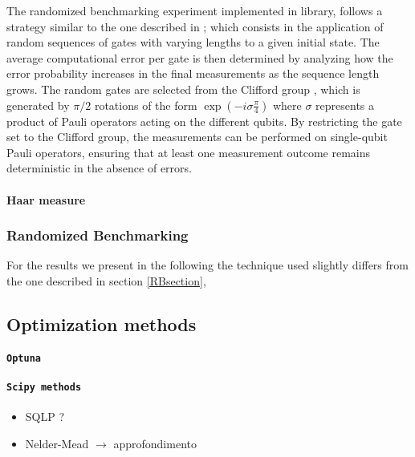 The randomized benchmarking experiment implemented in \Qibocal library, follows a strategy similar to the one described in \cite{knill_randomized_2008}; which consists in the application of random sequences of gates with varying lengths to a given initial state.
The average computational error per gate is then determined by analyzing how the error probability increases in the final measurements as the sequence length grows. 
The random gates are selected from the Clifford group \cite{gottesman1998heisenbergrepresentationquantumcomputers}, which is generated by $\pi/2$ rotations of the form $\exp\left(-i\sigma\frac{\pi}{4}\right)$ where $\sigma$ represents a product of Pauli operators acting on the different qubits. 
By restricting the gate set to the Clifford group, the measurements can be performed on single-qubit Pauli operators, ensuring that at least one measurement outcome remains deterministic in the absence of errors.

\paragraph{Haar measure}



\subsubsection{Randomized Benchmarking}
For the results we present in the following the technique used slightly differs from the one described in section \ref{RBsection}, %

\subsection{Optimization methods}
\paragraph{\tt{Optuna}}
\cite{optuna_2019}
\paragraph{\tt{Scipy} methods}
\cite{SciPy-NMeth}
\begin{itemize}
    \item SQLP ?
    \item Nelder-Mead $\rightarrow$ approfondimento
\end{itemize}
